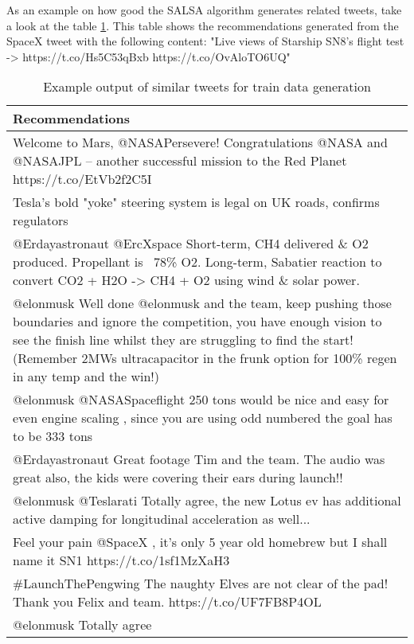 As an example on how good the SALSA algorithm generates related tweets, take a look at the table \ref{tab:example-train-data}. This table shows the recommendations generated from the SpaceX tweet with the following content: "Live views of Starship SN8’s flight test -> https://t.co/Hs5C53qBxb https://t.co/OvAloTO6UQ"

\begin{table}[!h]
	\centering
	\caption{Example output of similar tweets for train data generation}
	\label{tab:example-train-data}
	\begin{tabular}{|m{}|}
		\hline
		\textbf{Recommendations} \\
		\hline
		Welcome to Mars, @NASAPersevere! Congratulations @NASA and @NASAJPL – another successful mission to the Red Planet https://t.co/EtVb2f2C5I \\
		\hline
		Tesla’s bold "yoke" steering system is legal on UK roads, confirms regulators \\
		\hline
		@Erdayastronaut @ErcXspace Short-term, CH4 delivered \& O2 produced. Propellant is ~78\% O2. Long-term, Sabatier reaction to convert CO2 + H2O -> CH4 + O2 using wind \& solar power. \\
		\hline
		@elonmusk Well done @elonmusk and the team, keep pushing those boundaries and ignore the competition,  you have enough vision to see the finish line whilst they are struggling to find the start! (Remember 2MWs ultracapacitor in the frunk option for 100\% regen in any temp and the win!) \\
		\hline
		@elonmusk @NASASpaceflight 250 tons would be nice and easy for even engine scaling , since you are using odd numbered the goal has to be 333 tons \\
		\hline
		@Erdayastronaut Great footage Tim and the team. The audio was great also,  the kids were covering their ears during launch!! \\
		\hline
		@elonmusk @Teslarati Totally agree, the new Lotus ev has additional active damping for longitudinal acceleration as well... \\
		\hline
		Feel your pain @SpaceX , it's only 5 year old homebrew but I shall name it SN1 https://t.co/1sf1MzXaH3 \\
		\hline
		\#LaunchThePengwing The naughty Elves are not clear of the pad! Thank you Felix and team. https://t.co/UF7FB8P4OL \\
		\hline
		@elonmusk Totally agree \\
		\hline
	\end{tabular}
\end{table}


